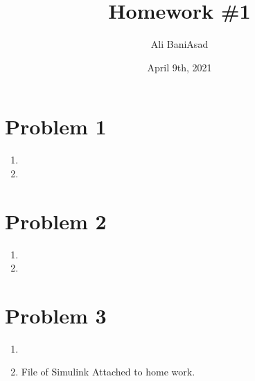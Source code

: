 \documentclass[12]{fphw}
\title{Homework \#1} %
\author{Ali BaniAsad} %
\date{April 9th, 2021} %
\institute{Sharif University of Technology \\ Institute of Aerospace} %
\begin{document}
	
	\maketitle %
	\section*{Problem 1}
	\begin{enumerate}[label=(\alph*)]
		\item 
		
		\item 
		
	\end{enumerate}
	\section*{Problem 2}
	\begin{enumerate}[label=(\alph*)]
		\item 
		
		\item 
		
	\end{enumerate}
	\section*{Problem 3}
	\begin{enumerate}[label=(\alph*)]
		\item
		
		\item 
		File of Simulink Attached to home work.
	\end{enumerate}


	
\end{document}
